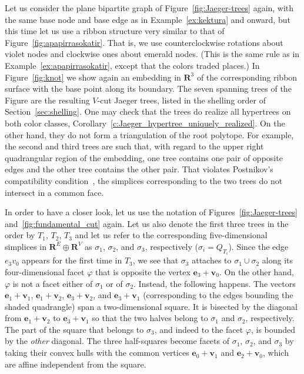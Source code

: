 \documentclass[ALCO,ThmDefs,Unicode,epreuves]{cedram}
\newcommand{\R}{\mathbf{R}}
\begin{document}
\begin{exam}
\label{ex:non-triangulation}
Let us consider the plane bipartite graph of Figure~\ref{fig:Jaeger-trees} again, with the same base node and base edge as in Example~\ref{ex:kektura} and onward, but this time let us use a ribbon structure very similar to that of Figure~\ref{fig:apapirrasokatir}. That is, we use counterclockwise rotations about violet nodes and clockwise ones about emerald nodes. (This is the same rule as in Example~\ref{ex:apapirrasokatir}, except that the colors traded places.) In Figure~\ref{fig:knot} we show again an embedding in $\R^3$ of the corresponding ribbon surface with the base point along its boundary. The seven spanning trees of the Figure are the resulting $V$-cut Jaeger trees, listed in the shelling order of Section~\ref{sec:shelling}. One may check that the trees do realize all hypertrees on both color classes, \cf Corollary~\ref{c:Jaeger_hypertree_uniquely_realized}. On the other hand, they do not form a triangulation of the root polytope. For example, the second and third trees are such that, with regard to the upper right quadrangular region of the embedding, one tree contains one pair of opposite edges and the other tree contains the other pair. That violates Postnikov's compatibility condition~\cite[Lemma~12.6]{alex}, \ie the simplices corresponding to the two trees do not intersect in a common face.

In order to have a closer look, let us use the notation of Figures~\ref{fig:Jaeger-trees} and~\ref{fig:fundamental_cut} again. Let us also denote the first three trees in the order by $T_1$, $T_2$, $T_3$ and let us refer to the corresponding five-dimensional simplices in $\R^E\oplus\R^V$ as $\sigma_1$, $\sigma_2$, and $\sigma_3$, respectively (\ie $\sigma_i=Q_{T_i}$). Since the edge $e_3v_0$ appears for the first time in $T_3$, we see that $\sigma_3$ attaches to $\sigma_1\cup\sigma_2$ along its four-dimensional facet $\varphi$ that is opposite the vertex $\mathbf e_3+\mathbf v_0$. On the other hand, $\varphi$ is not a facet either of $\sigma_1$ or of $\sigma_2$. Instead, the following happens. The vectors $\mathbf e_1+\mathbf v_1$, $\mathbf e_1+\mathbf v_2$, $\mathbf e_3+\mathbf v_2$, and $\mathbf e_3+\mathbf v_1$ (corresponding to the edges bounding the shaded quadrangle) span a two-dimensional square. It is bisected by the diagonal from $\mathbf e_1+\mathbf v_2$ to $\mathbf e_3+\mathbf v_1$ so that the two halves belong to $\sigma_1$ and $\sigma_2$, respectively. The part of the square that belongs to $\sigma_3$, and indeed to the facet $\varphi$, is bounded by the \emph{other} diagonal. The three half-squares become facets of $\sigma_1$, $\sigma_2$, and $\sigma_3$ by taking their convex hulls with the common vertices $\mathbf e_0+\mathbf v_1$ and $\mathbf e_2+\mathbf v_0$, which are affine independent from the square.
\end{exam}
\end{document}
